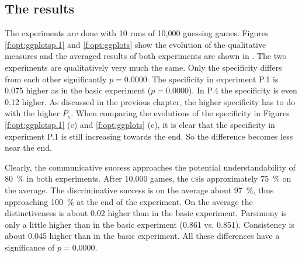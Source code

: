 \subsection{The results}

The experiments are done with 10 runs of 10,000 guessing games. Figures \ref{f:opt:ggplotsp.1} and \ref{f:opt:ggplots} show the evolution of the qualitative measures and the averaged results of both experiments are shown in . The two experiments are qualitatively very much the same. Only the specificity differs from each other significantly $p=0.0000$. The specificity in experiment P.1 is 0.075 higher as in the basic experiment ($p=0.0000$). In P.4 the specificity is even 0.12 higher. As discussed in the previous chapter, the higher specificity has to do with the higher $P_s$. When comparing the evolutions of the specificity in Figures \ref{f:opt:ggplotsp.1} (c) and \ref{f:opt:ggplots} (c), it is clear that the specificity in experiment P.1 is still increasing towards the end. So the difference becomes less near the end.

Clearly, the communicative success approaches the potential understandability of 80~\% in both experiments. After 10,000 games, the {\scshape cs}is approximately 75~\% on the average. The discriminative success is on the average about 97~\%, thus approaching 100~\% at the end of the experiment. On the average the distinctiveness is about 0.02 higher than in the basic experiment. Parsimony is only a little higher than in the basic experiment (0.861 vs. 0.851). Consistency is about 0.045 higher than in the basic experiment. All these differences have a significance of $p=0.0000$.

